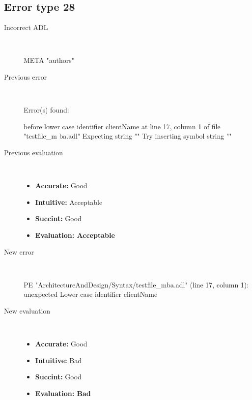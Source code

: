 \hrulefill

\subsection{Error type 28}
  \begin{description}
  \item[Incorrect ADL]~\\
\begin{adl}
META "authors" \end{adl}
  \item[Previous error]~\\
\begin{haskell}
Error(s) found:

before lower case identifier clientName at line 17, column 1 of file "testfile_m
ba.adl"
Expecting string ""
Try inserting symbol string ""
\end{haskell}
  \item[Previous evaluation]~\\
    \begin{itemize}
    \item \textbf{Accurate:} Good
    \item \textbf{Intuitive:} Acceptable
    \item \textbf{Succint:} Good
    \item \textbf{Evaluation: Acceptable}
    \end{itemize}
  \item[New error]~\\
\begin{haskell}
PE "ArchitectureAndDesign/Syntax/testfile_mba.adl" (line 17, column 1):
unexpected Lower case identifier clientName\end{haskell}
  \item[New evaluation]~\\
    \begin{itemize}
    \item \textbf{Accurate:} Good
    \item \textbf{Intuitive:} Bad
    \item \textbf{Succint:} Good
    \item \textbf{Evaluation: Bad
}
    \end{itemize}
  \end{description}

\hrulefill

